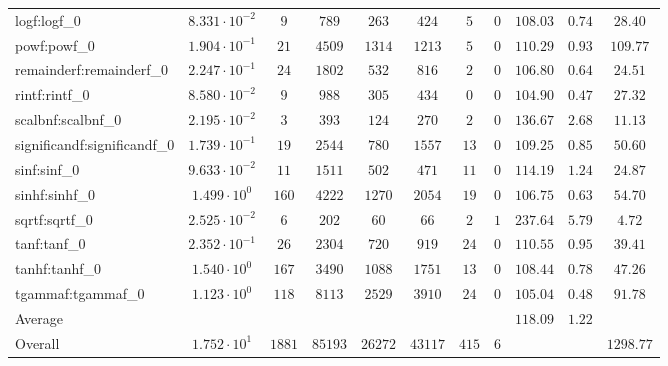 \begin{tabular}{|l|c|c|c|c|c|c|c|c|c|c|}
logf:logf\_0                 & $ 8.331 \cdot 10^{-2} $ & $ 9      $ & $ 789   $ & $ 263   $ & $ 424   $ & $ 5   $ & $ 0 $ & $ 108.03      $ & $ 0.74    $ & $ 28.40   $ \\
powf:powf\_0                 & $ 1.904 \cdot 10^{-1} $ & $ 21     $ & $ 4509  $ & $ 1314  $ & $ 1213  $ & $ 5   $ & $ 0 $ & $ 110.29      $ & $ 0.93    $ & $ 109.77  $ \\
remainderf:remainderf\_0     & $ 2.247 \cdot 10^{-1} $ & $ 24     $ & $ 1802  $ & $ 532   $ & $ 816   $ & $ 2   $ & $ 0 $ & $ 106.80      $ & $ 0.64    $ & $ 24.51   $ \\
rintf:rintf\_0               & $ 8.580 \cdot 10^{-2} $ & $ 9      $ & $ 988   $ & $ 305   $ & $ 434   $ & $ 0   $ & $ 0 $ & $ 104.90      $ & $ 0.47    $ & $ 27.32   $ \\
scalbnf:scalbnf\_0           & $ 2.195 \cdot 10^{-2} $ & $ 3      $ & $ 393   $ & $ 124   $ & $ 270   $ & $ 2   $ & $ 0 $ & $ 136.67      $ & $ 2.68    $ & $ 11.13   $ \\
significandf:significandf\_0 & $ 1.739 \cdot 10^{-1} $ & $ 19     $ & $ 2544  $ & $ 780   $ & $ 1557  $ & $ 13  $ & $ 0 $ & $ 109.25      $ & $ 0.85    $ & $ 50.60   $ \\
sinf:sinf\_0                 & $ 9.633 \cdot 10^{-2} $ & $ 11     $ & $ 1511  $ & $ 502   $ & $ 471   $ & $ 11  $ & $ 0 $ & $ 114.19      $ & $ 1.24    $ & $ 24.87   $ \\
sinhf:sinhf\_0               & $ 1.499 \cdot 10^{0}  $ & $ 160    $ & $ 4222  $ & $ 1270  $ & $ 2054  $ & $ 19  $ & $ 0 $ & $ 106.75      $ & $ 0.63    $ & $ 54.70   $ \\
sqrtf:sqrtf\_0               & $ 2.525 \cdot 10^{-2} $ & $ 6      $ & $ 202   $ & $ 60    $ & $ 66    $ & $ 2   $ & $ 1 $ & $ 237.64      $ & $ 5.79    $ & $ 4.72    $ \\
tanf:tanf\_0                 & $ 2.352 \cdot 10^{-1} $ & $ 26     $ & $ 2304  $ & $ 720   $ & $ 919   $ & $ 24  $ & $ 0 $ & $ 110.55      $ & $ 0.95    $ & $ 39.41   $ \\
tanhf:tanhf\_0               & $ 1.540 \cdot 10^{0}  $ & $ 167    $ & $ 3490  $ & $ 1088  $ & $ 1751  $ & $ 13  $ & $ 0 $ & $ 108.44      $ & $ 0.78    $ & $ 47.26   $ \\
tgammaf:tgammaf\_0           & $ 1.123 \cdot 10^{0}  $ & $ 118    $ & $ 8113  $ & $ 2529  $ & $ 3910  $ & $ 24  $ & $ 0 $ & $ 105.04      $ & $ 0.48    $ & $ 91.78   $ \\
\hline
Average                      & $                     $ & $        $ & $       $ & $       $ & $       $ & $     $ & $   $ & $ 118.09      $ & $ 1.22    $ & $         $ \\
\hline
Overall                      & $ 1.752 \cdot 10^{1}  $ & $ 1881   $ & $ 85193 $ & $ 26272 $ & $ 43117 $ & $ 415 $ & $ 6 $ & $             $ & $         $ & $ 1298.77 $ \\
\hline
\end{tabular}
